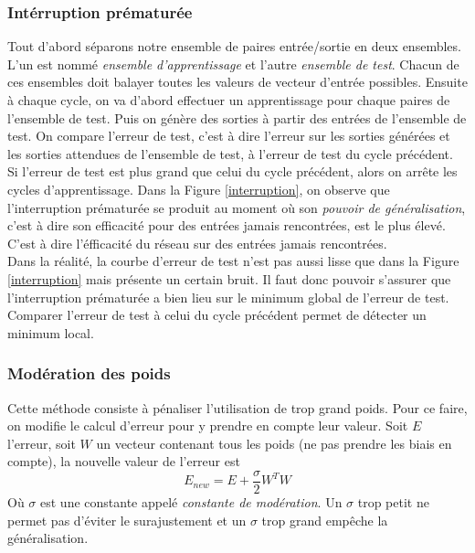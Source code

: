 \subsubsection*{Intérruption prématurée}
Tout d'abord séparons notre ensemble de paires entrée/sortie en deux ensembles.
L'un est nommé \emph{ensemble d'apprentissage} et l'autre \emph{ensemble de test}.
Chacun de ces ensembles doit balayer toutes les valeurs de vecteur d'entrée possibles.
Ensuite à chaque cycle, on va d'abord effectuer un apprentissage pour chaque paires de l'ensemble de test.
Puis on génère des sorties à partir des entrées de l'ensemble de test.
On compare l'erreur de test, c'est à dire l'erreur sur les sorties générées et les sorties attendues de l'ensemble de test, à l'erreur de test du cycle précédent.
Si l'erreur de test est plus grand que celui du cycle précédent, alors on arrête les cycles d'apprentissage.
Dans la Figure \ref{interruption}, on observe que l'interruption prématurée se produit au moment où son \emph{pouvoir de généralisation}, c'est à dire son efficacité pour des entrées jamais rencontrées, est le plus élevé.
C'est à dire l'éfficacité du réseau sur des entrées jamais rencontrées.\\

Dans la réalité, la courbe d'erreur de test n'est pas aussi lisse que dans la Figure \ref{interruption} mais présente un certain bruit.
Il faut donc pouvoir s'assurer que l'interruption prématurée a bien lieu sur le minimum global de l'erreur de test.
Comparer l'erreur de test à celui du cycle précédent permet de détecter un minimum local.
\subsubsection*{Modération des poids}
Cette méthode consiste à pénaliser l'utilisation de trop grand poids.
Pour ce faire, on modifie le calcul d'erreur pour y prendre en compte leur valeur.\cite{statistica}
Soit $E$ l'erreur, soit $W$ un vecteur contenant tous les poids (ne pas prendre les biais en compte), la nouvelle valeur de l'erreur est \[E_{new} = E + \frac{\sigma}{2}W^{T}W\]
Où $\sigma$ est une constante appelé \emph{constante de modération}.
Un $\sigma$ trop petit ne permet pas d'éviter le surajustement et un $\sigma$ trop grand empêche la généralisation.